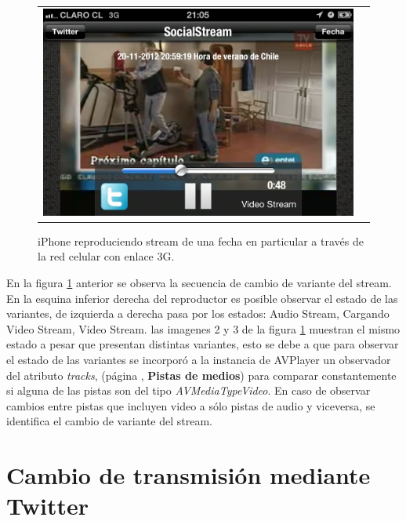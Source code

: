 \begin{figure}[H]
\begin{tabular}{cc}
	\includegraphics[scale=0.2]{imgs/cell-link-4.png} \\
	\end{tabular}
	\caption{iPhone reproduciendo stream de una fecha en particular a través de la red celular con enlace 3G.}
	\label{fig:cell-link}
\end{figure}

En la figura \ref{fig:cell-link} anterior se observa la secuencia de cambio de variante del stream. En la esquina inferior derecha del reproductor es posible observar el estado de las variantes, de izquierda a derecha pasa por los estados: Audio Stream, Cargando Video Stream, Video Stream. las imagenes 2 y 3 de la figura \ref{fig:cell-link} muestran el mismo estado a pesar que presentan distintas variantes, esto se debe a que para observar el estado de las variantes se  incorporó a la instancia de AVPlayer un observador del atributo \textit{tracks}, (página \pageref{item:kvo-tracks}, \textbf{Pistas de medios}) para comparar constantemente si alguna de las pistas son del tipo \textit{AVMediaTypeVideo}. 
En caso de observar cambios entre pistas que incluyen video a sólo pistas de audio y viceversa, se identifica el cambio de variante del stream.


\section{Cambio de transmisión mediante Twitter}

